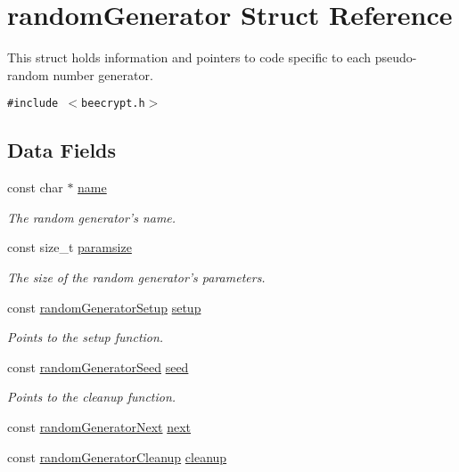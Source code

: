 \hypertarget{structrandomGenerator}{
\section{random\-Generator Struct Reference}
\label{structrandomGenerator}
}
This struct holds information and pointers to code specific to each pseudo-random number generator.  


{\tt \#include $<$beecrypt.h$>$}

\subsection*{Data Fields}
\begin{CompactItemize}
\item 
const char $\ast$ \hyperlink{structrandomGenerator_o0}{name}
\begin{CompactList}\small\item\em The random generator's name. \item\end{CompactList}\item 
const size\_\-t \hyperlink{structrandomGenerator_o1}{paramsize}
\begin{CompactList}\small\item\em The size of the random generator's parameters. \item\end{CompactList}\item 
const \hyperlink{beecrypt_8h_a2}{random\-Generator\-Setup} \hyperlink{structrandomGenerator_o2}{setup}
\begin{CompactList}\small\item\em Points to the setup function. \item\end{CompactList}\item 
const \hyperlink{beecrypt_8h_a3}{random\-Generator\-Seed} \hyperlink{structrandomGenerator_o3}{seed}
\begin{CompactList}\small\item\em Points to the cleanup function. \item\end{CompactList}\item 
const \hyperlink{beecrypt_8h_a4}{random\-Generator\-Next} \hyperlink{structrandomGenerator_o4}{next}
\item 
const \hyperlink{beecrypt_8h_a5}{random\-Generator\-Cleanup} \hyperlink{structrandomGenerator_o5}{cleanup}
\end{CompactItemize}


